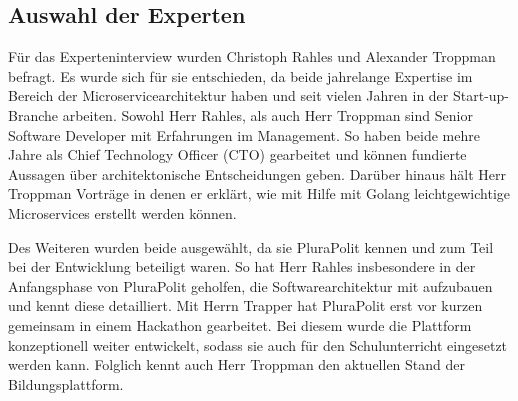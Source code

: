 \subsection{Auswahl der Experten}

Für das Experteninterview wurden Christoph Rahles und Alexander Troppman befragt. Es wurde sich für sie entschieden, da beide jahrelange Expertise im Bereich der Microservicearchitektur haben und seit vielen Jahren in der Start-up-Branche arbeiten. Sowohl Herr Rahles, als auch Herr Troppman sind Senior Software Developer mit Erfahrungen im Management. So haben beide mehre Jahre als Chief Technology Officer (CTO) gearbeitet und können fundierte Aussagen über architektonische Entscheidungen geben. Darüber hinaus hält Herr Troppman Vorträge in denen er erklärt, wie mit Hilfe mit Golang leichtgewichtige Microservices erstellt werden können.

Des Weiteren wurden beide ausgewählt, da sie PluraPolit kennen und zum Teil bei der Entwicklung beteiligt waren. So hat Herr Rahles insbesondere in der Anfangsphase von PluraPolit geholfen, die Softwarearchitektur mit aufzubauen und kennt diese detailliert.
Mit Herrn Trapper hat PluraPolit erst vor kurzen gemeinsam in einem Hackathon gearbeitet. Bei diesem wurde die Plattform konzeptionell weiter entwickelt, sodass sie auch für den Schulunterricht eingesetzt werden kann. Folglich kennt auch Herr Troppman den aktuellen Stand der Bildungsplattform.
